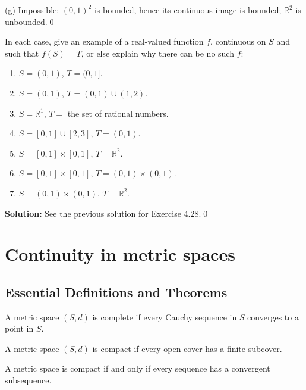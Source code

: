 (g) Impossible: $(0,1)^2$ is bounded, hence its continuous image is bounded; $\mathbb{R}^2$ is unbounded.\qed



\begin{problembox}
In each case, give an example of a real-valued function $f$, continuous on $S$ and such that $f(S) = T$, or else explain why there can be no such $f$:
\begin{enumerate}[label=(\alph*)]
\item $S = (0, 1)$, $T = (0, 1]$.
\item $S = (0, 1)$, $T = (0, 1) \cup (1, 2)$.
\item $S = \mathbb{R}^1$, $T =$ the set of rational numbers.
\item $S = [0, 1] \cup [2, 3]$, $T = (0, 1)$.
\item $S = [0, 1] \times [0, 1]$, $T = \mathbb{R}^2$.
\item $S = [0, 1] \times [0, 1]$, $T = (0, 1) \times (0, 1)$.
\item $S = (0, 1) \times (0, 1)$, $T = \mathbb{R}^2$.
\end{enumerate}
\end{problembox}

\noindent\textbf{Solution:} See the previous solution for Exercise 4.28.\qed

\section{Continuity in metric spaces}

\subsection*{Essential Definitions and Theorems}

\begin{definition}
A metric space $(S,d)$ is complete if every Cauchy sequence in $S$ converges to a point in $S$.
\end{definition}

\begin{definition}
A metric space $(S,d)$ is compact if every open cover has a finite subcover.
\end{definition}

\begin{theorem}
A metric space is compact if and only if every sequence has a convergent subsequence.
\end{theorem}

